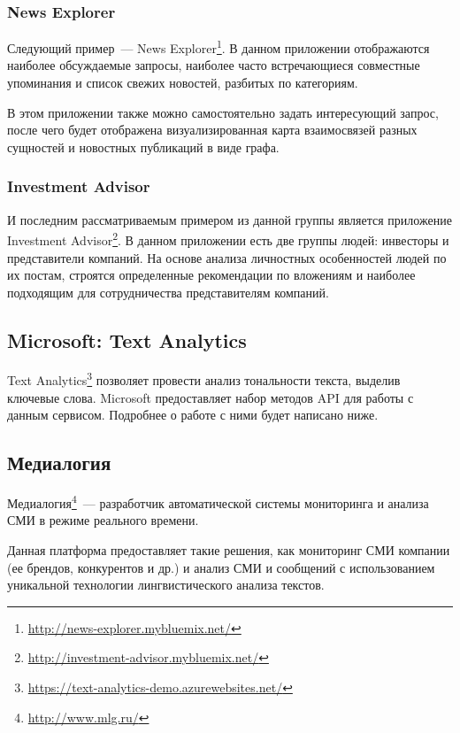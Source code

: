 \subsubsection{News Explorer}

Следующий пример~--- News Explorer\footnote{\url{http://news-explorer.mybluemix.net/}}. В данном приложении отображаются наиболее обсуждаемые запросы, наиболее часто встречающиеся совместные упоминания и список свежих новостей, разбитых по категориям.

В этом приложении также можно самостоятельно задать интересующий запрос, после чего будет отображена визуализированная карта взаимосвязей разных сущностей и новостных публикаций в виде графа.

\subsubsection{Investment Advisor}

И последним рассматриваемым примером из данной группы является приложение Investment Advisor\footnote{\url{http://investment-advisor.mybluemix.net/}}. В данном приложении есть две группы людей: инвесторы и представители компаний. На основе анализа личностных особенностей людей по их постам, строятся определенные рекомендации по вложениям и наиболее подходящим для сотрудничества представителям компаний.

\subsection{Microsoft: Text Analytics}

Text Analytics\footnote{\url{https://text-analytics-demo.azurewebsites.net/}} позволяет провести анализ тональности текста, выделив ключевые слова. Microsoft предоставляет набор методов API для работы с данным сервисом. Подробнее о работе с ними будет написано ниже.

\subsection{Медиалогия}

Медиалогия\footnote{\url{http://www.mlg.ru/}}~--- разработчик автоматической системы мониторинга и анализа СМИ в режиме реального времени.

Данная платформа предоставляет такие решения, как мониторинг СМИ компании (ее брендов, конкурентов и др.) и анализ СМИ и сообщений с использованием уникальной технологии лингвистического анализа текстов.


